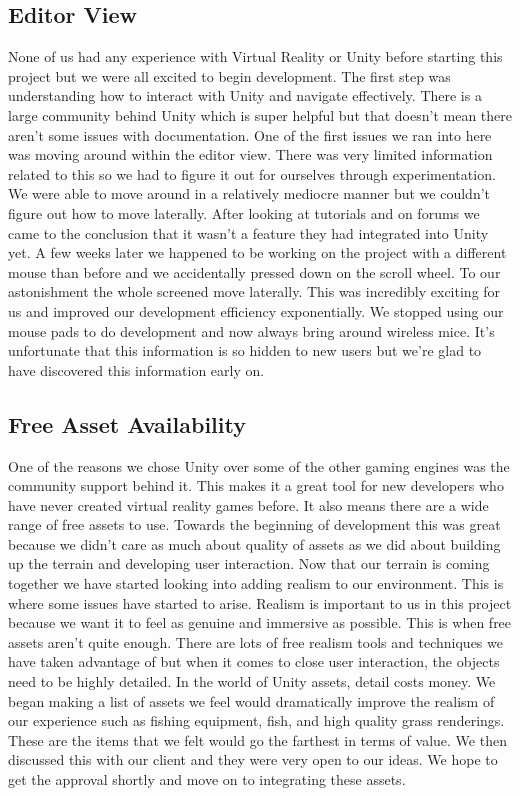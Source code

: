 \documentclass[10pt,journal,compsoc,onecolumn, draftclsnofoot]{IEEEtran}
\begin{document}
\subsection{Editor View}
None of us had any experience with Virtual Reality or Unity before starting this project but we were all excited to begin development.
The first step was understanding how to interact with Unity and navigate effectively.
There is a large community behind Unity which is super helpful but that doesn’t mean there aren’t some issues with documentation.
One of the first issues we ran into here was moving around within the editor view.
There was very limited information related to this so we had to figure it out for ourselves through experimentation.
We were able to move around in a relatively mediocre manner but we couldn’t figure out how to move laterally.
After looking at tutorials and on forums we came to the conclusion that it wasn’t a feature they had integrated into Unity yet.
A few weeks later we happened to be working on the project with a different mouse than before and we accidentally pressed down on the scroll wheel.
To our astonishment the whole screened move laterally.
This was incredibly exciting for us and improved our development efficiency exponentially.
We stopped using our mouse pads to do development and now always bring around wireless mice.
It’s unfortunate that this information is so hidden to new users but we’re glad to have discovered this information early on.

\subsection{Free Asset Availability}
One of the reasons we chose Unity over some of the other gaming engines was the community support behind it.
This makes it a great tool for new developers who have never created virtual reality games before.
It also means there are a wide range of free assets to use.
Towards the beginning of development this was great because we didn’t care as much about quality of assets as we did about building up the terrain and developing user interaction.
Now that our terrain is coming together we have started looking into adding realism to our environment.
This is where some issues have started to arise.
Realism is important to us in this project because we want it to feel as genuine and immersive as possible.
This is when free assets aren’t quite enough.
There are lots of free realism tools and techniques we have taken advantage of but when it comes to close user interaction, the objects need to be highly detailed.
In the world of Unity assets, detail costs money. We began making a list of assets we feel would dramatically improve the realism of our experience such as fishing equipment, fish, and high quality grass renderings.
These are the items that we felt would go the farthest in terms of value.
We then discussed this with our client and they were very open to our ideas.
We hope to get the approval shortly and move on to integrating these assets.
\end{document}
